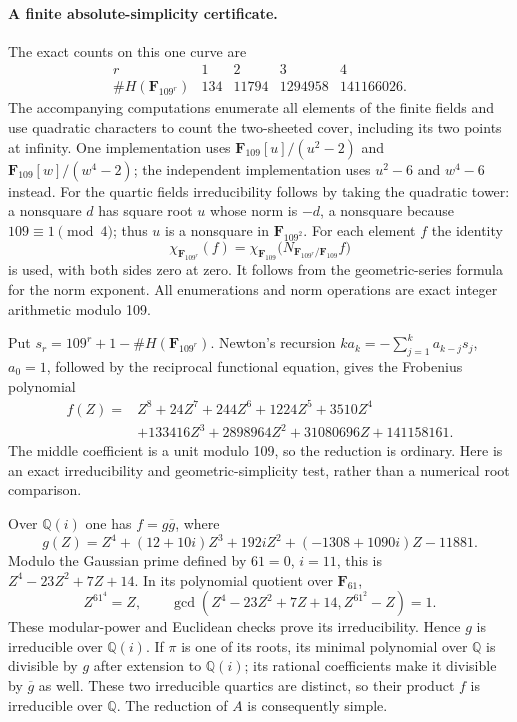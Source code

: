 \documentclass[11pt]{article}
\newcommand{\Q}{\mathbb Q}\newcommand{\C}{\mathbb C}\newcommand{\Z}{\mathbb Z}\newcommand{\R}{\mathbb R}\newcommand{\A}{\mathbb A}\newcommand{\OO}{\mathcal O}
\theoremstyle{definition}\newtheorem{definition}[theorem]{Definition}\newtheorem{remark}[theorem]{Remark}
\begin{document}
\paragraph{A finite absolute-simplicity certificate.}
The exact counts on this one curve are
\[
\begin{array}{c|rrrr}
 r&1&2&3&4\\\hline
 \#H(\mathbf F_{109^r})&134&11794&1294958&141166026 .
\end{array}
 \tag{C25g}
\]
The accompanying computations enumerate all elements of
the finite fields and use quadratic characters to count
the two-sheeted cover, including its two points at infinity.
One implementation uses
$\mathbf F_{109}[u]/(u^2-2)$ and
$\mathbf F_{109}[w]/(w^4-2)$; the independent implementation
uses $u^2-6$ and $w^4-6$ instead.
For the quartic fields irreducibility follows by taking
the quadratic tower: a nonsquare $d$ has square root
$u$ whose norm is $-d$, a nonsquare because
$109\equiv1\pmod4$; thus $u$ is a nonsquare in
$\mathbf F_{109^2}$.
For each element $f$ the identity
\[
 \chi_{\mathbf F_{109^r}}(f)
  =\chi_{\mathbf F_{109}}
       \bigl(N_{\mathbf F_{109^r}/\mathbf F_{109}}f\bigr)
\]
is used, with both sides zero at zero. It follows from
the geometric-series formula for the norm exponent.
All enumerations and norm operations are exact integer
arithmetic modulo 109.

Put $s_r=109^r+1-\#H(\mathbf F_{109^r})$.
Newton's recursion
$k a_k=-\sum_{j=1}^k a_{k-j}s_j$, $a_0=1$,
followed by the reciprocal functional equation, gives
the Frobenius polynomial
\[
\begin{split}
 f(Z)={}&Z^8+24Z^7+244Z^6+1224Z^5+3510Z^4\\
       &+133416Z^3+2898964Z^2+31080696Z+141158161.
\end{split}
 \tag{C25h}
\]
The middle coefficient is a unit modulo 109, so the
reduction is ordinary. Here is an exact irreducibility
and geometric-simplicity test, rather than a numerical
root comparison.

Over $\Q(i)$ one has $f=g\overline g$, where
\[
 g(Z)=Z^4+(12+10i)Z^3+192iZ^2+(-1308+1090i)Z-11881.
 \tag{C25i}
\]
Modulo the Gaussian prime defined by $61=0$, $i=11$,
this is $Z^4-23Z^2+7Z+14$.
In its polynomial quotient over $\mathbf F_{61}$,
\[
 Z^{61^4}=Z,\qquad
 \gcd(Z^4-23Z^2+7Z+14,Z^{61^2}-Z)=1.
 \tag{C25j}
\]
These modular-power and Euclidean checks prove its
irreducibility. Hence $g$ is irreducible over $\Q(i)$.
If $\pi$ is one of its roots, its minimal polynomial over
$\Q$ is divisible by $g$ after extension to $\Q(i)$;
its rational coefficients make it divisible by
$\overline g$ as well. These two irreducible quartics are
distinct, so their product $f$ is irreducible over $\Q$.
The reduction of $A$ is consequently simple.
\end{document}
